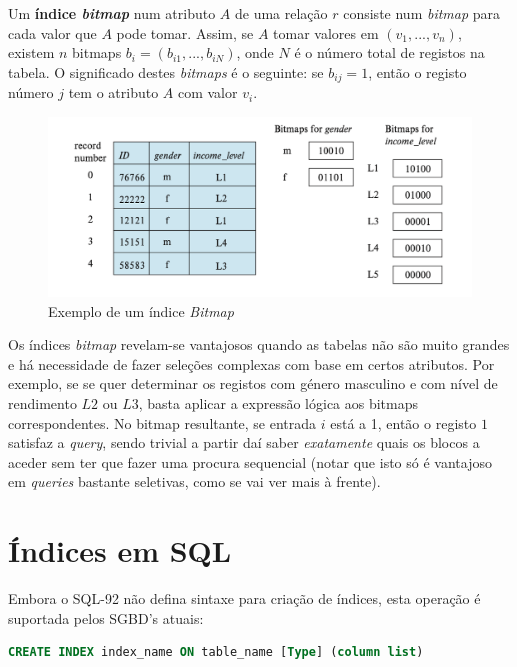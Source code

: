 \documentclass[oneside]{book}
\theoremstyle{definition}
\begin{document}
Um \textbf{índice \textit{bitmap}} num atributo $A$ de uma relação $r$ consiste num \textit{bitmap} para cada valor que $A$ pode tomar. Assim, se $A$ tomar valores em $(v_1, ..., v_n)$, existem $n$ bitmaps $b_i = (b_{i1}, ..., b_{iN})$, onde $N$ é o número total de registos na tabela. O significado destes \textit{bitmaps} é o seguinte: se $b_{ij} = 1$, então o registo número $j$ tem o atributo $A$ com valor $v_i$. \begin{figure}[H]
    \centering
    \includegraphics[scale = 0.60]{cap_indices/indice_bitmap.png}
    \caption{Exemplo de um índice \textit{Bitmap}}
\end{figure}

Os índices \textit{bitmap} revelam-se vantajosos quando as tabelas não são muito grandes e há necessidade de fazer seleções complexas com base em certos atributos. Por exemplo, se se quer determinar os registos com género masculino e com nível de rendimento $L2$ ou $L3$, basta aplicar a expressão lógica aos bitmaps correspondentes. No bitmap resultante, se entrada $i$ está a 1, então o registo $1$ satisfaz a \textit{query}, sendo trivial a partir daí saber \textit{exatamente} quais os blocos a aceder sem ter que fazer uma procura sequencial (notar que isto só é vantajoso em \textit{queries} bastante seletivas, como se vai ver mais à frente).
\pagebreak


\section{Índices em SQL}

Embora o SQL-92 não defina sintaxe para criação de índices, esta operação é suportada pelos SGBD's atuais:

\begin{lstlisting}[language=SQL, morekeywords={CALL, DECLARE, PROCEDURE, IF}, framesep=8pt, xleftmargin=40pt, framexleftmargin=40pt, frame=tb, framerule=0pt]
CREATE INDEX index_name ON table_name [Type] (column list)
\end{lstlisting}
\end{document}

